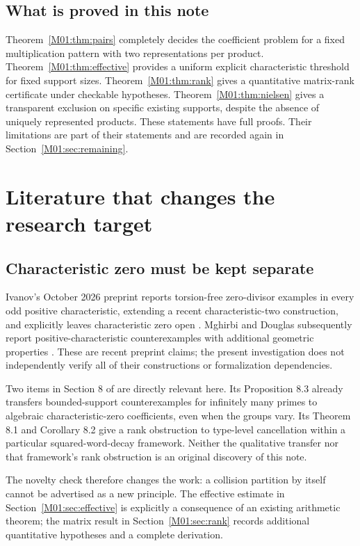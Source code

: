 \documentclass[11pt,a4paper,oneside]{report}
\theoremstyle{definition}
\theoremstyle{remark}
\begin{document}
\subsection{What is proved in this note}

Theorem~\ref{M01:thm:pairs} completely decides the coefficient problem for a
fixed multiplication pattern with two representations per product.
Theorem~\ref{M01:thm:effective} provides a uniform explicit characteristic
threshold for fixed support sizes. Theorem~\ref{M01:thm:rank} gives a
quantitative matrix-rank certificate under checkable hypotheses.
Theorem~\ref{M01:thm:nielsen} gives a transparent exclusion on specific existing
supports, despite the absence of uniquely represented products. These
statements have full proofs. Their limitations are part of their statements
and are recorded again in Section~\ref{M01:sec:remaining}.

\section{Literature that changes the research target}

\subsection{Characteristic zero must be kept separate}

Ivanov's October 2026 preprint reports torsion-free zero-divisor examples
in every odd positive characteristic, extending a recent characteristic-two
construction, and explicitly leaves characteristic zero open
\cite{B:Ivanov}. Mghirbi and Douglas subsequently report positive-characteristic
counterexamples with additional geometric properties \cite{B:MD}. These are
recent preprint claims; the present investigation does not independently
verify all of their constructions or formalization dependencies.

Two items in Section 8 of \cite{B:MD} are directly relevant here. Its
Proposition 8.3 already transfers bounded-support counterexamples for
infinitely many primes to algebraic characteristic-zero coefficients,
even when the groups vary. Its Theorem 8.1 and Corollary 8.2 give a
rank obstruction to type-level cancellation within a particular
squared-word-decay framework. Neither the qualitative transfer nor that
framework's rank obstruction is an original discovery of this note.

The novelty check therefore changes the work: a collision partition by
itself cannot be advertised as a new principle. The effective estimate in
Section~\ref{M01:sec:effective} is explicitly a consequence of an existing
arithmetic theorem; the matrix result in Section~\ref{M01:sec:rank} records
additional quantitative hypotheses and a complete derivation.
\end{document}
